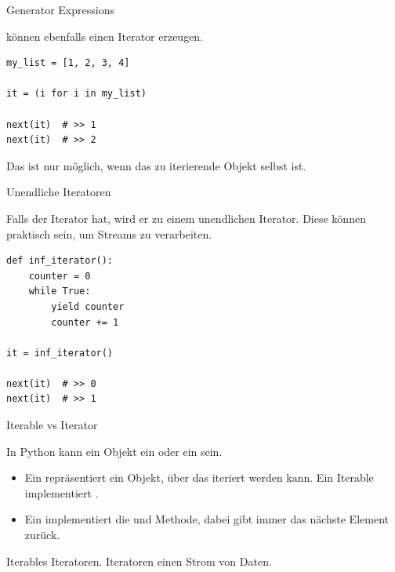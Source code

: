 \documentclass[12pt, aspectratio=169, usepdftitle=false, handout]{beamer}
\newcommand{\pp}[1]{\lpl{#1}}
\begin{document}
\begin{frame}[fragile]{Generator Expressions}

     können ebenfalls einen Iterator erzeugen.
    
    \medskip

    \begin{lstlisting}[language=pytiny]
my_list = [1, 2, 3, 4]

it = (i for i in my_list)

next(it)  # >> 1
next(it)  # >> 2
    \end{lstlisting}

Das ist nur möglich, wenn das zu iterierende Objekt selbst  ist.

\end{frame}

\begin{frame}[fragile]{Unendliche Iteratoren}

    Falls der Iterator  hat, wird er zu einem unendlichen Iterator. Diese können praktisch sein, um Streams zu verarbeiten.

    \begin{lstlisting}[language=pytiny]
def inf_iterator():
    counter = 0
    while True:
        yield counter
        counter += 1

it = inf_iterator()

next(it)  # >> 0
next(it)  # >> 1
    \end{lstlisting}

\end{frame}

\begin{frame}{Iterable vs Iterator}
    
    In Python kann ein Objekt ein  oder ein  sein.
    \begin{itemize}
        \item Ein  repräsentiert ein Objekt, über das iteriert werden kann. Ein Iterable implementiert \pp{__iter__()}.
        \item Ein  implementiert die \pp{__iter__()} und \pp{__next__()} Methode, dabei gibt \pp{__next__()} immer das nächste Element zurück.
    \end{itemize}

    Iterables  Iteratoren. Iteratoren  einen Strom von Daten.

\end{frame}
\end{document}
